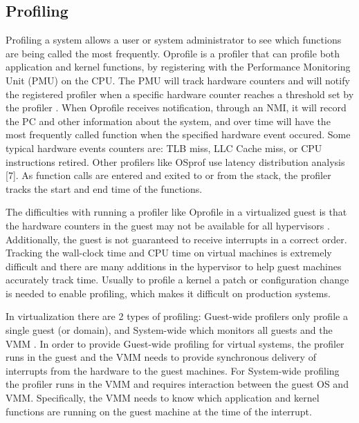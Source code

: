 \subsection{Profiling}
Profiling a system allows a user or system administrator to see which functions are being called the most frequently.  Oprofile \cite{levon} is a profiler that can profile both application and kernel functions, by registering with the Performance Monitoring Unit (PMU) on the CPU.  The PMU will track hardware counters and will notify the registered profiler when a specific hardware counter reaches a threshold set by the profiler \cite{mucci}.  When Oprofile receives notification, through an NMI, it will record the PC and other information about the system, and over time will have the most frequently called function when the specified hardware event occured.  Some typical hardware events counters are:  TLB miss, LLC Cache miss, or CPU instructions retired.   Other profilers like OSprof use latency distribution analysis [7].  As function calls are entered and exited to or from the stack, the profiler tracks the start and end time of the functions.

\indent The difficulties with running a profiler like Oprofile in a virtualized guest is that the hardware counters in the guest may not be available for all hypervisors \cite{buell1}.  Additionally, the guest is not guaranteed to receive interrupts in a correct order.   Tracking the wall-clock time and CPU time on virtual machines is extremely difficult and there are many additions in the hypervisor to help guest machines accurately track time.  Usually to profile a kernel a patch or configuration change is needed to enable profiling, which makes it difficult on production systems.

\indent In virtualization there are 2 types of profiling:  Guest-wide profilers only profile a single guest (or domain), and System-wide which monitors all guests and the VMM \cite{du1}.  In order to provide Guest-wide profiling for virtual systems, the profiler runs in the guest and the VMM needs to provide synchronous delivery of interrupts from the hardware to the guest machines.  For System-wide profiling the profiler runs in the VMM and requires interaction between the guest OS and VMM.  Specifically, the VMM needs to know which application and kernel functions are running on the guest machine at the time of the interrupt.

